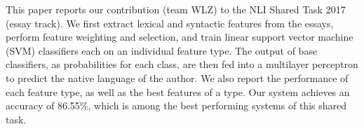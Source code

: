 This paper reports our contribution (team WLZ) to the NLI Shared Task 2017 (essay track). We first extract lexical and syntactic features from the essays, perform feature weighting and selection, and train linear support vector machine (SVM) classifiers each on an individual feature type. The output of base classifiers, as probabilities for each class, are then fed into a multilayer perceptron to predict the native language of the author. We also report the performance of each feature type, as well as the best features of a type. Our system achieves an accuracy of 86.55\%, which is among the best performing systems of this shared task.
